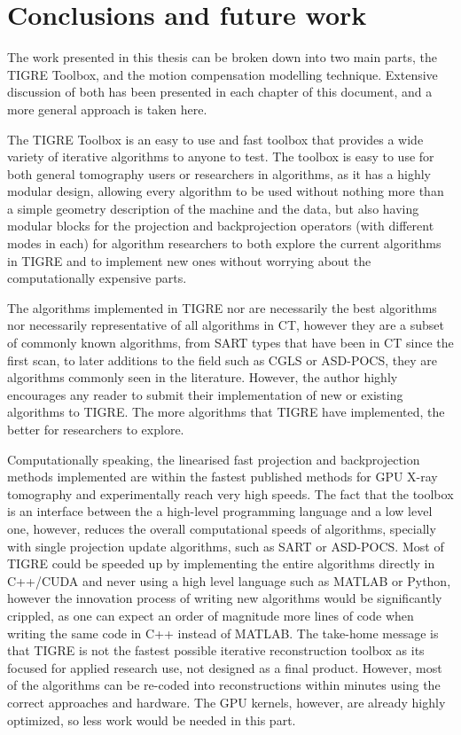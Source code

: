 \chapter{Conclusions and future work}

The work presented in this thesis can be broken down into two main parts, the TIGRE Toolbox, and the motion compensation modelling technique. Extensive discussion of both has been presented in each chapter of this document, and a more general approach is taken here. 

The TIGRE Toolbox is an easy to use and fast toolbox that provides a wide variety of iterative algorithms to anyone to test. The toolbox is easy to use for both general tomography users or researchers in algorithms, as it has a highly modular design, allowing every algorithm to be used without nothing more than a simple geometry description of the machine and the data, but also having modular blocks for the projection and backprojection operators (with different modes in each) for algorithm researchers to both explore the current algorithms in TIGRE and to implement new ones without worrying about the computationally expensive parts. 

The algorithms implemented in TIGRE nor are necessarily the best algorithms nor necessarily representative of all algorithms in CT, however they are a subset of commonly known algorithms, from SART types that have been in CT since the first scan, to later additions to the field such as CGLS or ASD-POCS, they are algorithms commonly seen in the literature. However, the author highly encourages any reader to submit their implementation of new or existing algorithms to TIGRE. The more algorithms that TIGRE have implemented, the better for researchers to explore.

Computationally speaking, the linearised fast projection and backprojection methods implemented are within the fastest published methods for GPU X-ray tomography and experimentally reach very high speeds. The fact that the toolbox is an interface between the a high-level programming language and a low level one, however, reduces the overall computational speeds of algorithms, specially with single projection update algorithms, such as SART or ASD-POCS. Most of TIGRE could be speeded up by implementing the entire algorithms directly in C++/CUDA and never using a high level language such as MATLAB or Python, however the innovation process of writing new algorithms would be significantly crippled, as one can expect an order of magnitude more lines of code when writing the same code in C++ instead of MATLAB. The take-home message is that TIGRE is not the fastest possible iterative reconstruction toolbox as its focused for applied research use, not designed as a final product. However, most of the algorithms can be re-coded into reconstructions within minutes using the correct approaches and hardware. The GPU kernels, however, are already highly optimized, so less work would be needed in this part.


